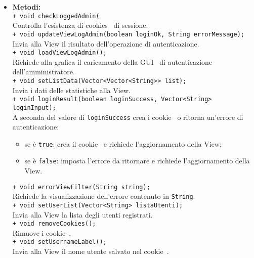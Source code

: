 {\begin{sloppypar}
{\begin{itemize}
\begin{itemize}
				\item[]  \textbf{Metodi:}\\
					\texttt{+ void checkLoggedAdmin(}\\
					Controlla l’esistenza di cookies\g~ di sessione.\\
					
					\texttt{+ void updateViewLogAdmin(boolean loginOk, String errorMessage);}\\
					Invia alla View il risultato dell’operazione di autenticazione.\\
					
					\texttt{+ void loadViewLogAdmin();}\\
					Richiede alla grafica il caricamento della GUI\g~ di autenticazione dell’amministratore.\\
					
					\texttt{+ void setListData(Vector<Vector<String>> list);}\\
					Invia i dati delle statistiche alla View.\\
					
					\texttt{+ void loginResult(boolean loginSuccess, Vector<String> loginInput);}\\
					A seconda del valore di \texttt{loginSuccess} crea i cookie\g~ o ritorna un’errore di autenticazione:
					\begin{itemize}
						\item se è \texttt{true}: crea il cookie\g~ e richiede l’aggiornamento della View;
						\item se è \texttt{false}: imposta l’errore da ritornare e richiede l’aggiornamento della View.\\
					\end{itemize}
					
					\texttt{+ void errorViewFilter(String string);}\\
					Richiede la visualizzazione dell’errore contenuto in \texttt{String}.\\
					
					\texttt{+ void setUserList(Vector<String> listaUtenti);}\\
					Invia alla View la lista degli utenti registrati.\\
					
					\texttt{+ void removeCookies();}\\
					Rimuove i cookie\g~.\\
					
					\texttt{+ void setUsernameLabel();}\\
					Invia alla View il nome utente salvato nel cookie\g~.\\
			\end{itemize}
		

\end{itemize}}
\end{sloppypar}}
